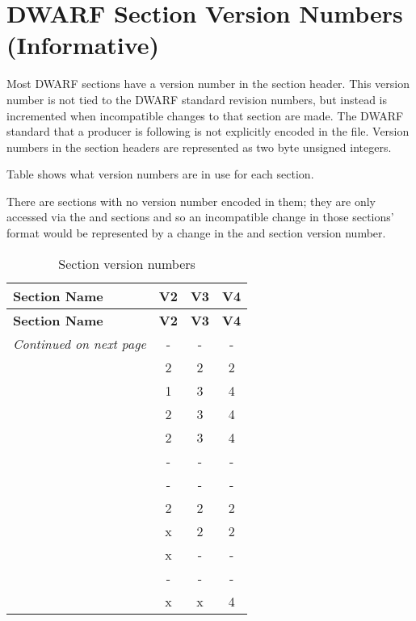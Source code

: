 
\chapter[Section Version Numbers (Informative)]{DWARF Section Version Numbers (Informative)}
\label{app:dwarfsectionversionnumbersinformative}


Most DWARF sections have a version number in the section
header. This version number is not tied to the DWARF standard
revision numbers, but instead is incremented when incompatible
changes to that section are made. The DWARF standard that
a producer is following is not explicitly encoded in the
file. Version numbers in the section headers are represented
as two byte unsigned integers. 

Table 
shows what version
numbers are in use for each section.

There are sections with no version number encoded in them;
they are only accessed via the 
\dotdebuginfo{} and 
\dotdebugtypes{}
sections and so an incompatible change in those sections'
format would be represented by a change in the 
and \dotdebugtypes{} section version number.

\clearpage
\begin{centering}
\setlength{\extrarowheight}{0.1cm}
\begin{longtable}{lccc}
  \caption{Section version numbers} \label{tab:sectionversionnumbers} \\
  \hline \bfseries Section Name &\bfseries V2 &\bfseries V3 &\bfseries V4 \\ \hline
\endfirsthead
   \bfseries Section Name &\bfseries V2 &\bfseries V3 &\bfseries V4 \\ \hline
\endhead
  \hline \emph{Continued on next page}
\endfoot
  \hline
\endlastfoot
\dotdebugabbrev{}& -  & -  & -  \\
\dotdebugaranges{}&2&2&2 \\
\dotdebugframe{}&1&3&4 \\
\dotdebuginfo{}&2&3&4 \\
\dotdebugline{}&2&3&4   \\
\dotdebugloc{}& -  & -  & -  \\
\dotdebugmacinfo{}& -  & - & -   \\
\dotdebugpubnames{}&2&2&2    \\
\dotdebugpubtypes{}&x&2&2   \\
\dotdebugranges{}&x& - & -  \\
\dotdebugstr{}& -  & -  & -  \\
\dotdebugtypes{}&x&x&4   \\
\end{longtable}
\end{centering}


